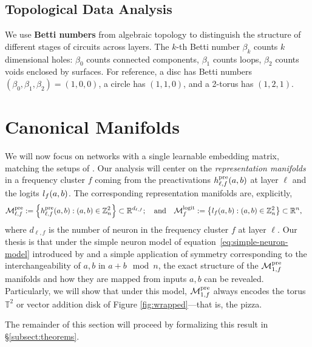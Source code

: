 \documentclass{article} %
\def\eqref#1{equation~\ref{#1}}
\theoremstyle{plain}
\theoremstyle{definition}
\newtheorem{empirical fact}[theorem]{Empirical Fact}
\begin{document}
\subsection{Topological Data Analysis}

We use \textbf{Betti numbers} from algebraic topology to distinguish the structure of different stages of circuits across layers. The $k$-th Betti number $\beta_k$ counts $k$ dimensional holes: $\beta_0$ counts connected components, $\beta_1$ counts loops, $\beta_2$ counts voids enclosed by surfaces. For reference, a disc has Betti numbers $(\beta_0, \beta_1, \beta_2) = (1, 0, 0)$, a circle has $(1, 1, 0)$, and a 2-torus has $(1, 2, 1)$.



\section{Canonical Manifolds}
We will now focus on networks with a single learnable embedding matrix, matching the setups of \citet{nanda2023progress,zhong2023the,mccracken2025uncoveringuniversalabstractalgorithm}.
Our analysis will center on the \emph{representation manifolds} in a frequency cluster $f$ coming from the preactivations $h_{\ell, f}^{\mathrm{pre}}(a, b)$ at layer $\ell$ and the logits $l_{f}(a, b)$. The corresponding representation manifolds are, explicitly,
\begin{align*}
    \mathcal{M}^{\rm pre}_{\ell, f} &:= \left\{h_{\ell, f}^{\mathrm{pre}}(a, b) : (a, b)\in\mathbb{Z}_n^2\right\} \subset \mathbb{R}^{d_{\ell,f}};\quad\mathrm{and}\quad
    \mathcal{M}^{\rm logit}_{f} := \left\{l_{f}(a, b) : (a, b)\in\mathbb{Z}_n^2\right\}\subset\mathbb{R}^n,
\end{align*}
where $d_{\ell, f}$ is the number of neuron in the frequency cluster $f$ at layer $\ell$.
Our thesis is that under the simple neuron model of \eqref{eq:simple-neuron-model} introduced by \citet{mccracken2025uncoveringuniversalabstractalgorithm} and a simple application of symmetry corresponding to the interchangeability of $a, b$ in $a + b \mod n$, the exact structure of the $\mathcal{M}^{\rm pre}_{1, f}$ manifolds and how they are mapped from inputs $a, b$ can be revealed.
Particularly, we will show that under this model, $\mathcal{M}^{\rm pre}_{1, f}$ always encodes the torus $\mathbb{T}^2$ or vector addition disk of Figure \ref{fig:wrapped}---that is, the pizza.

The remainder of this section will proceed by formalizing this result in \S\ref{subsect:theorems}.
\end{document}
